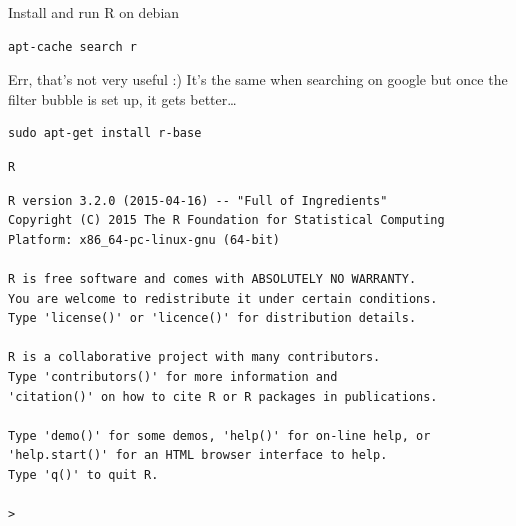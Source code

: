 \documentclass[11pt,xcolor=dvipsnames]{beamer}
\begin{document}
\begin{frame}[fragile,label=sec-4-1-4]{Install and run R on debian}
 \small
\begin{verbatim}
apt-cache search r
\end{verbatim}
Err, that's not very useful :) It's the same when searching on
google but once the filter bubble is set up, it gets better\ldots{}
\begin{verbatim}
sudo apt-get install r-base
\end{verbatim}

\begin{verbatim}
R
\end{verbatim}

\scriptsize
\begin{verbatim}
R version 3.2.0 (2015-04-16) -- "Full of Ingredients"
Copyright (C) 2015 The R Foundation for Statistical Computing
Platform: x86_64-pc-linux-gnu (64-bit)

R is free software and comes with ABSOLUTELY NO WARRANTY.
You are welcome to redistribute it under certain conditions.
Type 'license()' or 'licence()' for distribution details.

R is a collaborative project with many contributors.
Type 'contributors()' for more information and
'citation()' on how to cite R or R packages in publications.

Type 'demo()' for some demos, 'help()' for on-line help, or
'help.start()' for an HTML browser interface to help.
Type 'q()' to quit R.

>
\end{verbatim}
\end{frame}
\end{document}
